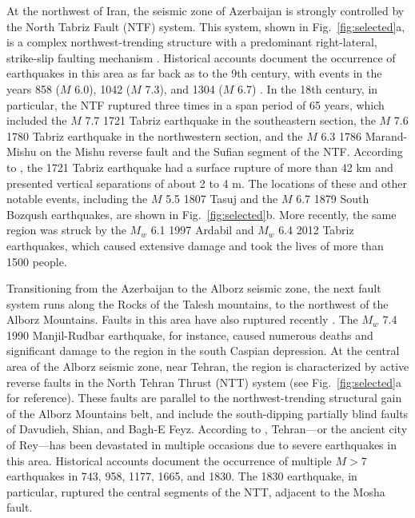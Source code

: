 At the northwest of Iran, the seismic zone of Azerbaijan is strongly controlled by the North Tabriz Fault (NTF) system. This system, shown in Fig.~\ref{fig:selected}a, is a complex northwest-trending structure with a predominant right-lateral, strike-slip faulting mechanism \citep{Berberian1999}. Historical accounts document the occurrence of earthquakes in this area as far back as to the 9th century, with events in the years 858 ($M$ 6.0), 1042 ($M$ 7.3), and 1304 ($M$ 6.7) \citep{Berberian1999}. In the 18th century, in particular, the NTF ruptured three times in a span period of 65 years, which included the $M$ 7.7 1721 Tabriz earthquake in the southeastern section, the $M$ 7.6 1780 Tabriz earthquake in the northwestern section, and the $M$ 6.3 1786 Marand-Mishu on the Mishu reverse fault and the Sufian segment of the NTF. According to \citet{Jones1834}, the 1721 Tabriz earthquake had a surface rupture of more than 42 km and presented vertical separations of about 2 to 4 m. The locations of these and other notable events, including the $M$ 5.5 1807 Tasuj and the $M$ 6.7 1879 South Bozqush earthquakes, are shown in Fig.~\ref{fig:selected}b. More recently, the same region was struck by the $M_w$ 6.1 1997 Ardabil and $M_w$ 6.4 2012 Tabriz earthquakes, which caused extensive damage and took the lives of more than 1500 people.

Transitioning from the Azerbaijan to the Alborz seismic zone, the next fault system runs along the Rocks of the Talesh mountains, to the northwest of the Alborz Mountains. Faults in this area have also ruptured recently \citep{Berberian1999}. The $M_w$ 7.4 1990 Manjil-Rudbar earthquake, for instance, caused numerous deaths and significant damage to the region in the south Caspian depression. At the central area of the Alborz seismic zone, near Tehran, the region is characterized by active reverse faults in the North Tehran Thrust (NTT) system (see Fig.~\ref{fig:selected}a for reference). These faults are parallel to the northwest-trending structural gain of the Alborz Mountains belt, and include the south-dipping partially blind faults of Davudieh, Shian, and Bagh-E Feyz. According to \citet{Ambraseys_1982_Book}, Tehran---or the ancient city of Rey---has been devastated in multiple occasions due to severe earthquakes in this area. Historical accounts document the occurrence of multiple $M>7$ earthquakes in 743, 958, 1177, 1665, and 1830. The 1830 earthquake, in particular, ruptured the central segments of the NTT, adjacent to the Mosha fault.


